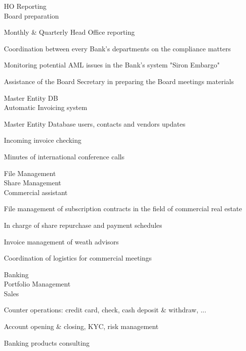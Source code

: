 \documentclass[a4paper,11pt]{cv4tw}%
\begin{document}
	{HO Reporting\\Board preparation}
		{
		\begin{missions}
			\item Monthly \& Quarterly Head Office reporting
			\item Coordination between every Bank's departments on the compliance matters
			\item Monitoring potential AML issues in the Bank's system "Siron Embargo"
			\item Assistance of the Board Secretary in preparing the Board meetings materials
		\end{missions}
	}


	{Master Entity DB\\Automatic Invoicing system}
		{
		\begin{missions}
			\item Master Entity Database users, contacts and vendors updates
			\item Incoming invoice checking
			\item Minutes of international conference calls
		\end{missions}
	}

	{File Management\\Share Management\\Commercial assistant}
		{ 
		\begin{missions}
			\item File management of subscription contracts in the field of commercial real estate
			\item In charge of share repurchase and payment schedules
			\item Invoice management of weath advisors
			\item Coordination of logistics for commercial meetings
		\end{missions}
	}

	{Banking\\Portfolio Management\\Sales}
		{ 
		\begin{missions}
			\item Counter operations: credit card, check, cash deposit \& withdraw, ...
			\item Account opening \& closing, KYC, risk management
			\item Banking products consulting
		\end{missions}
	}
\end{document}
